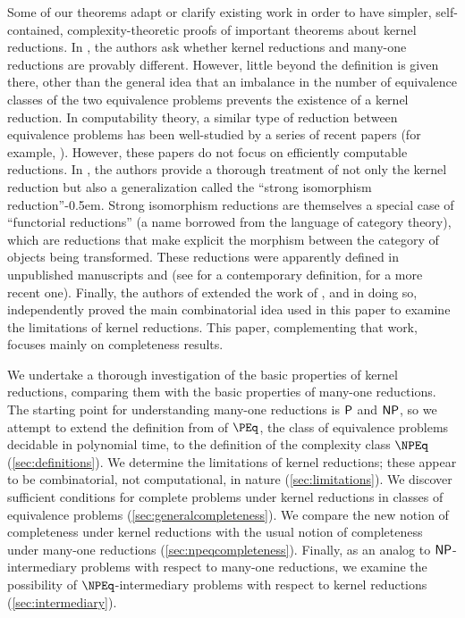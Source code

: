 Some of our theorems adapt or clarify existing work in order to have simpler, self-contained, complexity-theoretic proofs of important theorems about kernel reductions.
In \autocite{fg11}, the authors ask whether kernel reductions and many-one reductions are provably different.
However, little beyond the definition is given there, other than the general idea that an imbalance in the number of equivalence classes of the two equivalence problems prevents the existence of a kernel reduction.
In computability theory, a similar type of reduction between equivalence problems has been well-studied by a series of recent papers (for example, \autocite{gg01, ff12, ffn12, chm12, imnn13, almnss14, mn14}).
However, these papers do not focus on efficiently computable reductions.
In \autocite{bcffm}, the authors provide a thorough treatment of not only the kernel reduction but also a generalization called the ``strong isomorphism reduction''\kern-0.5em.
Strong isomorphism reductions are themselves a special case of ``functorial reductions'' (a name borrowed from the language of category theory), which are reductions that make explicit the morphism between the category of objects being transformed.
These reductions were apparently defined in unpublished manuscripts \autocite{babai77} and \autocite{kucera76} (see \autocite[Section~15]{zkt85} for a contemporary definition, \autocite[Section~7]{babai14} for a more recent one).
Finally, the authors of \autocite{gz14} extended the work of \autocite{bcffm}, and in doing so, independently proved the main combinatorial idea used in this paper to examine the limitations of kernel reductions.
This paper, complementing that work, focuses mainly on completeness results.

We undertake a thorough investigation of the basic properties of kernel reductions, comparing them with the basic properties of many-one reductions.
The starting point for understanding many-one reductions is $\P$ and $\NP$, so we attempt to extend the definition from \autocite{fg11} of $\PEq$, the class of equivalence problems decidable in polynomial time, to the definition of the complexity class $\NPEq$ (\autoref{sec:definitions}).
We determine the limitations of kernel reductions; these appear to be combinatorial, not computational, in nature (\autoref{sec:limitations}).
We discover sufficient conditions for complete problems under kernel reductions in classes of equivalence problems (\autoref{sec:generalcompleteness}).
We compare the new notion of completeness under kernel reductions with the usual notion of completeness under many-one reductions (\autoref{sec:npeqcompleteness}).
Finally, as an analog to $\NP$-intermediary problems with respect to many-one reductions, we examine the possibility of $\NPEq$-intermediary problems with respect to kernel reductions (\autoref{sec:intermediary}).
